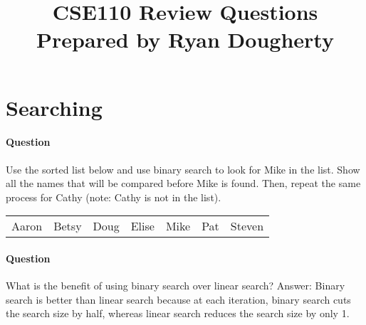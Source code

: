 \documentclass{article}
\date{}
\begin{document}
\title{\textbf{CSE110 Review Questions \\
Prepared by Ryan Dougherty}}
\maketitle

\section*{Searching}


\setcounter{question_num}{1}
\paragraph{Question }
Use the sorted list below and use binary search to look for Mike in the list. Show all the names that will be compared before Mike is found. Then, repeat the same process for Cathy (note: Cathy is not in the list).
\begin{table}[h]
\begin{tabular}{lllllll}
Aaron & Betsy & Doug & Elise & Mike & Pat & Steven
\end{tabular}
\end{table}

\addtocounter{question_num}{1}
\paragraph{Question }
What is the benefit of using binary search over linear search? {\color{red}Answer: Binary search is better than linear search because at each iteration, binary search cuts the search size by half, whereas linear search reduces the search size by only 1.}
\end{document}
